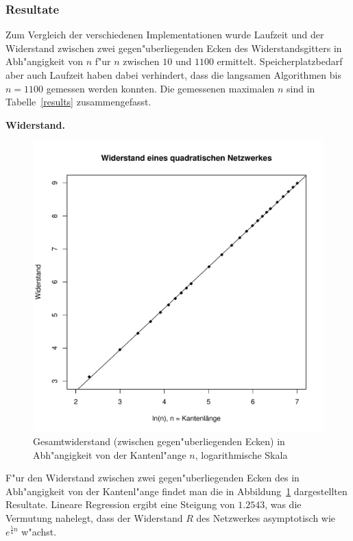 \subsubsection{Resultate}
Zum Vergleich der verschiedenen Implementationen wurde Laufzeit
und der Widerstand zwischen zwei gegen"uberliegenden Ecken des
Widerstandsgitters in Abh"angigkeit von $n$ f"ur $n$ zwischen $10$ und
$1100$ ermittelt. Speicherplatzbedarf aber auch Laufzeit haben dabei
verhindert, dass die langsamen Algorithmen bis $n=1100$ gemessen werden
konnten. Die gemessenen maximalen $n$ sind in Tabelle~\ref{results}
zusammengefasst.

\medskip
{\parindent0pt
{\bf Widerstand.}}
\begin{figure}
\begin{center}
\includegraphics[width=\hsize]{applications/resistance}
\end{center}
\caption{Gesamtwiderstand (zwischen gegen"uberliegenden Ecken)
in Abh"angigkeit von der Kantenl"ange $n$,
logarithmische Skala\label{resistance}}
\end{figure}
F"ur den Widerstand zwischen zwei gegen"uberliegenden Ecken des
in Abh"angigkeit von der Kantenl"ange findet man die in
Abbildung~\ref{resistance} dargestellten Resultate. Lineare Regression 
ergibt eine Steigung von $1.2543$, was die Vermutung nahelegt, dass der
Widerstand $R$ des Netzwerkes asymptotisch wie $e^{\frac54n}$ w"achst.

